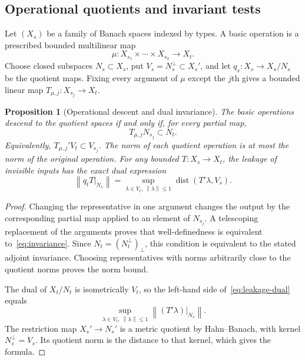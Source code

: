 \documentclass[11pt,a4paper]{amsart}
\numberwithin{equation}{section}
\newtheorem{proposition}[theorem]{Proposition}
\theoremstyle{definition}
\theoremstyle{remark}
\DeclareMathOperator{\dist}{dist}
\newcommand{\norm}[1]{\left\lVert#1\right\rVert}
\begin{document}
\subsection{Operational quotients and invariant tests}
Let $(X_s)$ be a family of Banach spaces indexed by types. A basic operation is a prescribed bounded multilinear map
\[
 \mu:X_{s_1}\times\cdots\times X_{s_k}\longrightarrow X_t.
\]
Choose closed subspaces $N_s\subset X_s$, put $V_s=N_s^\perp\subset X_s'$, and let $q_s:X_s\to X_s/N_s$ be the quotient maps. Fixing every argument of $\mu$ except the $j$th gives a bounded linear map $T_{\mu,j}:X_{s_j}\to X_t$.

\begin{proposition}[Operational descent and dual invariance]\label{prop:congruence}
The basic operations descend to the quotient spaces if and only if, for every partial map,
\begin{equation}\label{eq:invariance}
 T_{\mu,j}N_{s_j}\subset N_t.
\end{equation}
Equivalently, $T_{\mu,j}'V_t\subset V_{s_j}$. The norm of each quotient operation is at most the norm of the original operation. For any bounded $T:X_s\to X_t$, the leakage of invisible inputs has the exact dual expression
\begin{equation}\label{eq:leakage-dual}
 \norm{q_tT|_{N_s}}
 =\sup_{\lambda\in V_t,\ \norm\lambda\le1}
       \dist(T'\lambda,V_s).
\end{equation}
\end{proposition}
\begin{proof}
Changing the representative in one argument changes the output by the corresponding partial map applied to an element of $N_{s_j}$. A telescoping replacement of the arguments proves that well-definedness is equivalent to~\eqref{eq:invariance}. Since $N_t=(N_t^\perp)_\perp$, this condition is equivalent to the stated adjoint invariance. Choosing representatives with norms arbitrarily close to the quotient norms proves the norm bound.

The dual of $X_t/N_t$ is isometrically $V_t$, so the left-hand side of~\eqref{eq:leakage-dual} equals
\[
 \sup_{\lambda\in V_t,\ \norm\lambda\le1}
       \norm{(T'\lambda)|_{N_s}}.
\]
The restriction map $X_s'\to N_s'$ is a metric quotient by Hahn--Banach, with kernel $N_s^\perp=V_s$. Its quotient norm is the distance to that kernel, which gives the formula.
\end{proof}
\end{document}
